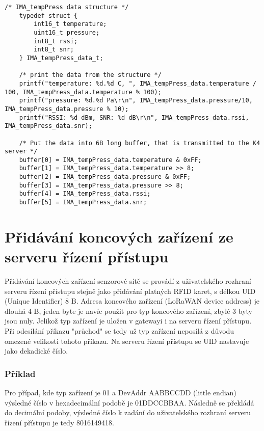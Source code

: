 \begin{lstlisting}[style=CStyle]
    /* IMA_tempPress data structure */   
    typedef struct {
        int16_t temperature;
        uint16_t pressure;
        int8_t rssi;
        int8_t snr;
    } IMA_tempPress_data_t;

    /* print the data from the structure */
    printf("temperature: %d.%d C, ", IMA_tempPress_data.temperature / 100, IMA_tempPress_data.temperature % 100);
    printf("pressure: %d.%d Pa\r\n", IMA_tempPress_data.pressure/10, IMA_tempPress_data.pressure % 10);
    printf("RSSI: %d dBm, SNR: %d dB\r\n", IMA_tempPress_data.rssi, IMA_tempPress_data.snr);

    /* Put the data into 6B long buffer, that is transmitted to the K4 server */
    buffer[0] = IMA_tempPress_data.temperature & 0xFF;
    buffer[1] = IMA_tempPress_data.temperature >> 8;
    buffer[2] = IMA_tempPress_data.pressure & 0xFF;
    buffer[3] = IMA_tempPress_data.pressure >> 8;
    buffer[4] = IMA_tempPress_data.rssi;
    buffer[5] = IMA_tempPress_data.snr;
\end{lstlisting}



\section{Přidávání koncových zařízení ze serveru řízení přístupu}
Přidávání koncových zařízení senzorové sítě se provádí z uživatelského rozhraní serveru řízení přístupu stejně jako přidávání platných RFID karet, s délkou UID (Unique Identifier) 8 B.
Adresa koncového zařízení (LoRaWAN device address) je dlouhá 4 B, jeden byte je navíc použit pro typ koncového zařízení, zbylé 3 byty jsou nuly.
Jelikož typ zařízení je uložen v gatewayi i na serveru řízení přístupu. Při odesílání příkazu "průchod" se tedy už typ zařízení neposílá z důvodu omezené velikosti tohoto příkazu.
Na serveru řízení přístupu se UID nastavuje jako dekadické číslo.

\subsubsection{Příklad}
Pro případ, kde typ zařízení je 01 a DevAddr AABBCCDD (little endian) výsledné číslo v hexadecimální podobě je 01DDCCBBAA. Následně se překládá do decimální podoby, výsledné číslo k zadání do uživatelského rozhraní serveru řízení přístupu je tedy 8016149418.











